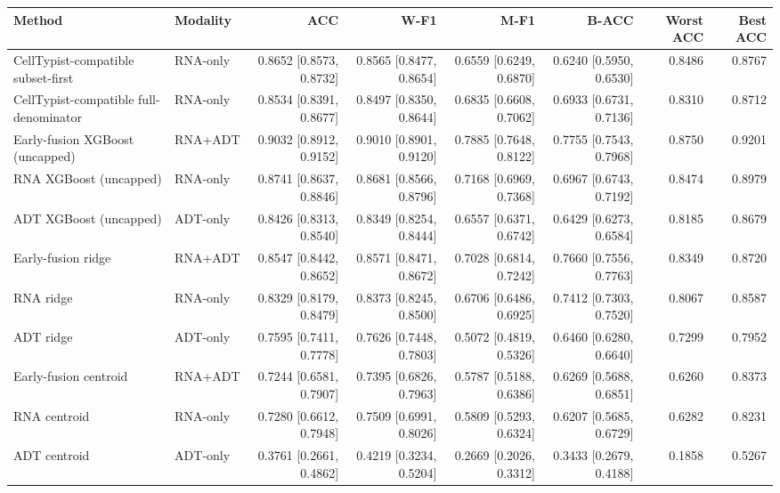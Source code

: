 \begin{tabular}{llrrrrrr}
\toprule
Method & Modality & ACC & W-F1 & M-F1 & B-ACC & Worst ACC & Best ACC \\
\midrule
CellTypist-compatible subset-first & RNA-only & 0.8652 [0.8573, 0.8732] & 0.8565 [0.8477, 0.8654] & 0.6559 [0.6249, 0.6870] & 0.6240 [0.5950, 0.6530] & 0.8486 & 0.8767 \\
CellTypist-compatible full-denominator & RNA-only & 0.8534 [0.8391, 0.8677] & 0.8497 [0.8350, 0.8644] & 0.6835 [0.6608, 0.7062] & 0.6933 [0.6731, 0.7136] & 0.8310 & 0.8712 \\
Early-fusion XGBoost (uncapped) & RNA+ADT & 0.9032 [0.8912, 0.9152] & 0.9010 [0.8901, 0.9120] & 0.7885 [0.7648, 0.8122] & 0.7755 [0.7543, 0.7968] & 0.8750 & 0.9201 \\
RNA XGBoost (uncapped) & RNA-only & 0.8741 [0.8637, 0.8846] & 0.8681 [0.8566, 0.8796] & 0.7168 [0.6969, 0.7368] & 0.6967 [0.6743, 0.7192] & 0.8474 & 0.8979 \\
ADT XGBoost (uncapped) & ADT-only & 0.8426 [0.8313, 0.8540] & 0.8349 [0.8254, 0.8444] & 0.6557 [0.6371, 0.6742] & 0.6429 [0.6273, 0.6584] & 0.8185 & 0.8679 \\
Early-fusion ridge & RNA+ADT & 0.8547 [0.8442, 0.8652] & 0.8571 [0.8471, 0.8672] & 0.7028 [0.6814, 0.7242] & 0.7660 [0.7556, 0.7763] & 0.8349 & 0.8720 \\
RNA ridge & RNA-only & 0.8329 [0.8179, 0.8479] & 0.8373 [0.8245, 0.8500] & 0.6706 [0.6486, 0.6925] & 0.7412 [0.7303, 0.7520] & 0.8067 & 0.8587 \\
ADT ridge & ADT-only & 0.7595 [0.7411, 0.7778] & 0.7626 [0.7448, 0.7803] & 0.5072 [0.4819, 0.5326] & 0.6460 [0.6280, 0.6640] & 0.7299 & 0.7952 \\
Early-fusion centroid & RNA+ADT & 0.7244 [0.6581, 0.7907] & 0.7395 [0.6826, 0.7963] & 0.5787 [0.5188, 0.6386] & 0.6269 [0.5688, 0.6851] & 0.6260 & 0.8373 \\
RNA centroid & RNA-only & 0.7280 [0.6612, 0.7948] & 0.7509 [0.6991, 0.8026] & 0.5809 [0.5293, 0.6324] & 0.6207 [0.5685, 0.6729] & 0.6282 & 0.8231 \\
ADT centroid & ADT-only & 0.3761 [0.2661, 0.4862] & 0.4219 [0.3234, 0.5204] & 0.2669 [0.2026, 0.3312] & 0.3433 [0.2679, 0.4188] & 0.1858 & 0.5267 \\
\bottomrule
\end{tabular}
